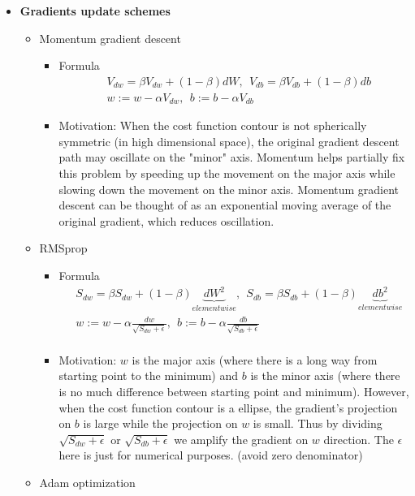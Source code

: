 \begin{itemize}
    \item \textbf{Gradients update schemes}
    \begin{itemize}
            \item Momentum gradient descent
    \begin{itemize}
        \item Formula\\
        \begin{align*}
            &V_{dw} = \beta V_{dw} + (1-\beta) dW,~~
            V_{db} = \beta V_{db} + (1-\beta) db\\
            &w:=w-\alpha V_{dw},~~ b:=b-\alpha V_{db}
        \end{align*}
        \item Motivation: When the cost function contour is not spherically symmetric (in high dimensional space), the original gradient descent path may oscillate on the "minor" axis. Momentum helps partially fix this problem by speeding up the movement on the major axis while slowing down the movement on the minor axis. Momentum gradient descent can be thought of as an exponential moving average of the original gradient, which reduces oscillation. 
    \end{itemize}
    \item RMSprop
    \begin{itemize}
        \item Formula
        \begin{align*}
            &S_{dw} = \beta S_{dw} + (1-\beta) \underbrace{dW^2}_{elementwise},~~
            S_{db} = \beta S_{db} + (1-\beta) \underbrace{db^2}_{elementwise} \\
            &w:= w-\alpha\frac{dw}{\sqrt{S_{dw} + \epsilon}},~~
            b:= b-\alpha\frac{db}{\sqrt{S_{db} + \epsilon}}\\
        \end{align*}
        \item Motivation: $w$ is the major axis (where there is a long way from starting point to the minimum) and $b$ is the minor axis (where there is no much difference between starting point and minimum). However, when the cost function contour is a ellipse, the gradient's projection on $b$ is large while the projection on $w$ is small. Thus by dividing ${\sqrt{S_{dw} + \epsilon}}$ or ${\sqrt{S_{db} + \epsilon}}$ we amplify the gradient on $w$ direction. The $\epsilon$ here is just for numerical purposes. (avoid zero denominator)
    \end{itemize}
    \item Adam optimization

\end{itemize}
\end{itemize}
